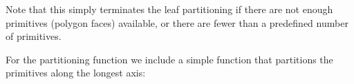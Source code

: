 \documentclass[letterpaper,10pt,english]{sphinxmanual}
\begin{document}
\begin{sphinxVerbatim}[commandchars=\\\{\}]
\PYG{p}{[}\PYG{p}{]}
\end{sphinxVerbatim}

\sphinxAtStartPar
Note that this simply terminates the leaf partitioning if there are not enough primitives (polygon faces) available, or there are fewer than a pre\sphinxhyphen{}defined number of primitives.

\sphinxAtStartPar
For the partitioning function we include a simple function that partitions the primitives along the longest axis:
\end{document}
